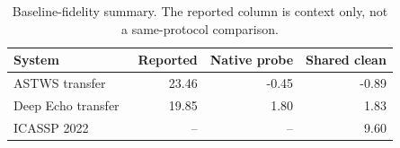 \begin{table}[t]
\caption{Baseline-fidelity summary. The reported column is context only, not a same-protocol comparison.}
\label{tab:baseline-fidelity}
\centering
\scriptsize
\begin{tabular}{lrrr}
\hline
System & Reported & Native probe & Shared clean \\
\hline
ASTWS transfer~\cite{zhao2024astws} & 23.46 & -0.45 & -0.89 \\
Deep Echo transfer~\cite{zhao2024deepecho} & 19.85 & 1.80 & 1.83 \\
ICASSP 2022~\cite{cutler2022aec} & -- & -- & 9.60 \\
\hline
\end{tabular}
\end{table}
